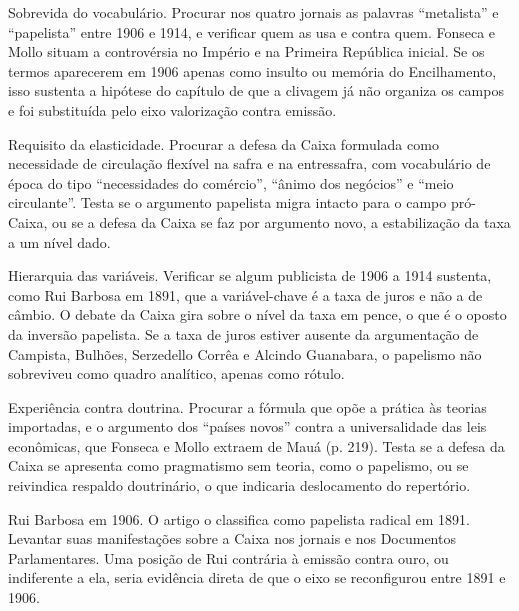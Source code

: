 \begin{dialogo}
\item Sobrevida do vocabulário. Procurar nos quatro jornais as palavras
``metalista'' e ``papelista'' entre 1906 e 1914, e verificar quem as usa e
contra quem. Fonseca e Mollo situam a controvérsia no Império e na Primeira
República inicial. Se os termos aparecerem em 1906 apenas como insulto ou
memória do Encilhamento, isso sustenta a hipótese do capítulo de que a
clivagem já não organiza os campos e foi substituída pelo eixo valorização
contra emissão.

\item Requisito da elasticidade. Procurar a defesa da Caixa formulada como
necessidade de circulação flexível na safra e na entressafra, com vocabulário
de época do tipo ``necessidades do comércio'', ``ânimo dos negócios'' e
``meio circulante''. Testa se o argumento papelista migra intacto para o campo
pró-Caixa, ou se a defesa da Caixa se faz por argumento novo, a estabilização
da taxa a um nível dado.

\item Hierarquia das variáveis. Verificar se algum publicista de 1906 a 1914
sustenta, como Rui Barbosa em 1891, que a variável-chave é a taxa de juros e
não a de câmbio. O debate da Caixa gira sobre o nível da taxa em pence, o que
é o oposto da inversão papelista. Se a taxa de juros estiver ausente da
argumentação de Campista, Bulhões, Serzedello Corrêa e Alcindo Guanabara, o
papelismo não sobreviveu como quadro analítico, apenas como rótulo.

\item Experiência contra doutrina. Procurar a fórmula que opõe a prática às
teorias importadas, e o argumento dos ``países novos'' contra a universalidade
das leis econômicas, que Fonseca e Mollo extraem de Mauá (p. 219). Testa se a
defesa da Caixa se apresenta como pragmatismo sem teoria, como o papelismo, ou
se reivindica respaldo doutrinário, o que indicaria deslocamento do repertório.

\item Rui Barbosa em 1906. O artigo o classifica como papelista radical em
1891. Levantar suas manifestações sobre a Caixa nos jornais e nos Documentos
Parlamentares. Uma posição de Rui contrária à emissão contra ouro, ou
indiferente a ela, seria evidência direta de que o eixo se reconfigurou entre
1891 e 1906.
\end{dialogo}

